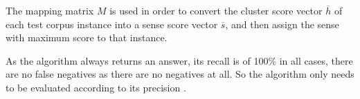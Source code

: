 The mapping matrix $M$ is used in order to convert the cluster score vector
$\overline{h}$ of each test corpus instance into a sense score vector
$\overline{s}$, and then assign the sense with maximum score to that instance.

As the algorithm always returns an answer, its recall is of 100\% in all
cases, there are no false negatives as there are no negatives at all. So the
algorithm only needs to be evaluated according to its precision
\citep{agirre2006evaluating}.


